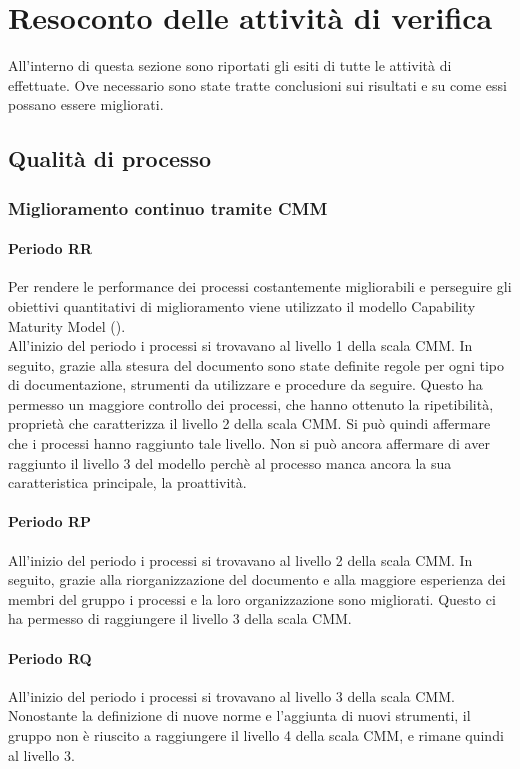 \documentclass[PdQ.tex]{subfiles}
\begin{document}
\section{Resoconto delle attività di verifica}
All'interno di questa sezione sono riportati gli esiti di tutte le attività di  effettuate. Ove necessario sono state tratte conclusioni sui risultati e su come essi possano essere migliorati.

\subsection{Qualità di processo}
	\subsubsection{Miglioramento continuo tramite CMM}
		\paragraph{Periodo RR}
		Per rendere le performance dei processi costantemente migliorabili e perseguire gli obiettivi quantitativi di miglioramento viene utilizzato il modello Capability Maturity Model ().\\
		All'inizio del periodo i processi si trovavano al livello 1 della scala CMM. In seguito, grazie alla stesura del documento \NPdocRR{} sono state definite regole per ogni tipo di documentazione, strumenti da utilizzare e procedure da seguire. Questo ha permesso un maggiore controllo dei processi, che hanno ottenuto la ripetibilità, proprietà che caratterizza il livello 2 della scala CMM. Si può quindi affermare che i processi hanno raggiunto tale livello. Non si può ancora affermare di aver raggiunto il livello 3 del modello perchè al processo manca ancora la sua caratteristica principale, la proattività.\\

\paragraph{Periodo RP}

		All'inizio del periodo i processi si trovavano al livello 2 della scala CMM. In seguito, grazie alla riorganizzazione del documento \NPdocRP{} e alla maggiore esperienza dei membri del gruppo i processi e la loro organizzazione sono migliorati. Questo ci ha permesso di raggiungere il livello 3 della scala CMM.

\paragraph{Periodo RQ}
	All'inizio del periodo i processi si trovavano al livello 3 della scala CMM. Nonostante la definizione di nuove norme e l'aggiunta di nuovi strumenti, il gruppo non è riuscito a raggiungere il livello 4 della scala CMM, e rimane quindi al livello 3.
	
\end{document}
